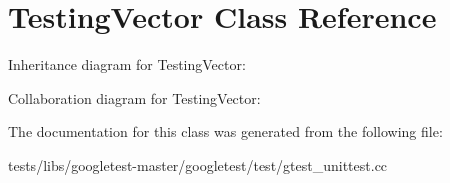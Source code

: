 \hypertarget{classTestingVector}{}\section{Testing\+Vector Class Reference}
\label{classTestingVector}


Inheritance diagram for Testing\+Vector\+:


Collaboration diagram for Testing\+Vector\+:


The documentation for this class was generated from the following file\+:\begin{DoxyCompactItemize}
\item 
tests/libs/googletest-\/master/googletest/test/gtest\+\_\+unittest.\+cc\end{DoxyCompactItemize}
